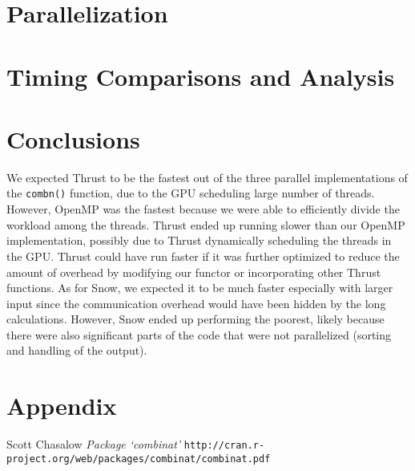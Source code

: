 \documentclass[12pt]{article}
\begin{document}
{\section{Parallelization}







\section{Timing Comparisons and Analysis}



\section{Conclusions}
We expected Thrust to be the fastest out of the three parallel implementations of the \texttt{combn()} function, due to the GPU scheduling large number of threads. However, OpenMP was the fastest because we were able to efficiently divide the workload among the threads. Thrust ended up running slower than our OpenMP implementation, possibly due to Thrust dynamically scheduling the threads in the GPU. Thrust could have run faster if it was further optimized to reduce the amount of overhead by modifying our functor or incorporating other Thrust functions. As for Snow, we expected it to be much faster especially with larger input since the communication overhead would have been hidden by the long calculations. However, Snow ended up performing the poorest, likely because there were also significant parts of the code that were not parallelized (sorting and handling of the output).




\newpage

\appendix

\section{Appendix}



\newpage


\begin{thebibliography}{9}
Scott Chasalow
\textit{Package `combinat'}
\texttt{http://cran.r-project.org/web/packages/combinat/combinat.pdf}


\end{thebibliography}}
\end{document}
